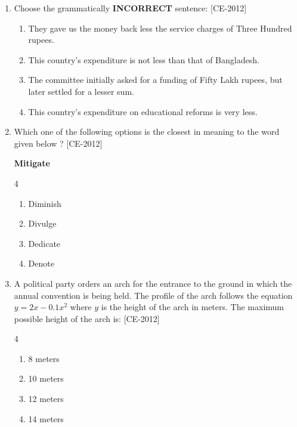 \documentclass[journal]{IEEEtran}
\begin{document}
\begin{enumerate}
    \item Choose the grammatically \textbf{INCORRECT} sentence: \hfill{[CE-2012]}

    

    \begin{enumerate}
        \item They gave us the money back less the service charges of Three Hundred rupees. 
        \item This country's expenditure is not less than that of Bangladesh. 
        \item The committee initially asked for a funding of Fifty Lakh rupees, but later settled for a lesser sum. 
        \item This country's expenditure on educational reforms is very less. 
    \end{enumerate}


    \item Which one of the following options is the closest in meaning to the word given below ? \hfill{[CE-2012]}

    \textbf{Mitigate}
    \begin{multicols}{4}
        
    
    \begin{enumerate}
        \item Diminish
        \item Divulge
        \item Dedicate
        \item Denote
    \end{enumerate}
    \end{multicols}




  \item A political party orders an arch for the entrance to the ground in which the annual convention is being held. The profile of the arch follows the equation $y = 2x - 0.1x^2$ where $y$ is the height of the arch in meters. The maximum possible height of the arch is: \hfill{[CE-2012]}
\begin{multicols}{4}
    

    \begin{enumerate}
        \item 8 meters
        \item 10 meters
        \item 12 meters
        \item 14 meters
    \end{enumerate}
    \end{multicols}


\end{enumerate}
\end{document}
